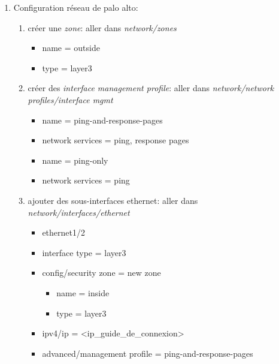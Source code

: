 \documentclass[a4paper]{article}
\begin{document}
\begin{enumerate}
\item Configuration réseau de palo alto:
\begin{enumerate}
    \item créer une \textit{zone}: aller dans \textit{network/zones}
    \begin{example} \begin{itemize}
        \item name = outside
        \item type = layer3
    \end{itemize} \end{example}
    \item créer des \textit{interface management profile}: aller dans \textit{network/network profiles/interface mgmt}
    \begin{example} \begin{itemize}
        \item name = ping-and-response-pages
        \item network services = ping, response pages
    \end{itemize} \end{example}
    \begin{example} \begin{itemize}
        \item name = ping-only
        \item network services = ping
    \end{itemize} \end{example}
    \item ajouter des sous-interfaces ethernet: aller dans \textit{network/interfaces/ethernet}
    \begin{example} \begin{itemize}
        \item ethernet1/2
        \item interface type = layer3
        \item config/security zone = new zone
        \begin{example} \begin{itemize}
            \item name = inside
            \item type = layer3
        \end{itemize} \end{example}
        \item ipv4/ip = <ip\_guide\_de\_connexion>
        \item advanced/management profile = ping-and-response-pages

\end{itemize}
\end{example}
\end{enumerate}
\end{enumerate}
\end{document}
